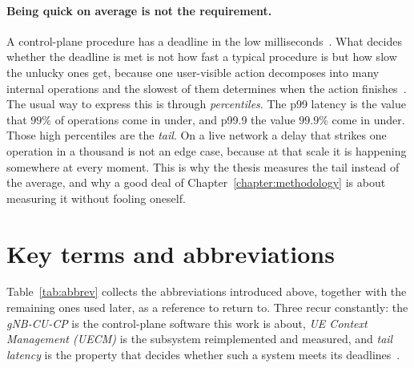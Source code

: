 \documentclass[english,twoside,openright,a4paper,censored,csm,software-track-2020]{HYthesisML}
\begin{document}
\paragraph{Being quick on average is not the requirement.}
A control-plane procedure has a deadline in the low milliseconds~\cite{3gpp22261}. What
decides whether the deadline is met is not how fast a typical procedure is but how slow the
unlucky ones get, because one user-visible action decomposes into many internal operations and
the slowest of them determines when the action finishes~\cite{dean2013tail}. The usual way to
express this is through \emph{percentiles}. The p99 latency is the value that $99\%$ of
operations come in under, and p99.9 the value $99.9\%$ come in under. Those high percentiles
are the \emph{tail}. On a live network a delay that strikes one operation in a thousand is not
an edge case, because at that scale it is happening somewhere at every moment. This is why the
thesis measures the tail instead of the average, and why a good deal of
Chapter~\ref{chapter:methodology} is about measuring it without fooling oneself.

\section{Key terms and abbreviations}
Table~\ref{tab:abbrev} collects the abbreviations introduced above, together with the
remaining ones used later, as a reference to return to. Three recur constantly: the
\emph{gNB-CU-CP} is the control-plane software this work is about, \emph{UE Context Management
(UECM)} is the subsystem reimplemented and measured, and \emph{tail latency} is the property
that decides whether such a system meets its
deadlines~\cite{dean2013tail,barroso2017microseconds}.
\end{document}

